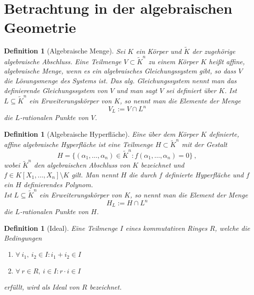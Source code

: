 \documentclass[11pt]{beamer}
\newcommand{\coloneqq}{:=}
\theoremstyle{custom}
\theoremstyle{custom}
\newtheorem{dfn}[theorem]{Definition}
\begin{document}
	\section{Betrachtung in der algebraischen Geometrie}
	\begin{frame}
		\begin{dfn}[Algebraische Menge]\label{def:alg_menge}
			\pause
			Sei $K$ ein Körper und $\tilde{K}$ der zugehörige algebraische Abschluss.
			Eine Teilmenge $V \subset \tilde{K}^n$ zu einem Körper $K$ heißt affine, algebraische Menge, wenn es ein algebraisches Gleichungssystem gibt, so dass $V$ die Lösungsmenge des Systems ist. Das alg. Gleichungssystem nennt man das definierende Gleichungssystem von $V$ und man sagt $V$ sei definiert über $K$.
			Ist $L \subseteq \tilde{K}^{n}$ ein Erweiterungskörper von $K$, so nennt man die Elemente der Menge
			\begin{equation*}
				V_{L} \coloneqq V \cap L^{n}
			\end{equation*}
			die $L$-rationalen Punkte von $V$.
		\end{dfn}
	\end{frame}
	\begin{frame}
		\begin{dfn}[Algebraische Hyperfläche]
			\pause
			Eine über dem Körper $K$ definierte, affine algebraische Hyperfläche ist eine Teilmenge $H \subset \tilde{K}^{n}$ mit der Gestalt
			\begin{equation}
				H = \{\left( \alpha_{1},\dots,\alpha_{n}\right) \in \tilde{K}^{n} \colon f\left(  \alpha_{1},\dots,\alpha_{n}\right) = 0  \} \ , 
			\end{equation}
			wobei $\tilde{K}^{n}$ den algebraischen Abschluss von $K$ bezeichnet und \newline ${f \in K\left[ X_{1},\dots, X_{n}\right] \setminus K}$ gilt. Man nennt $H$ die durch $f$ definierte Hyperfläche und $f$ ein $H$ definierendes Polynom.\\
			Ist $L \subseteq \tilde{K}^{n}$ ein Erweiterungskörper von $K$, so nennt man die Element der Menge
			\begin{equation*}
				H_{L} \coloneqq H \cap L^{n}
			\end{equation*}
			die $L$-rationalen Punkte von $H$.
		\end{dfn}
	\end{frame}
	\begin{frame}
		\begin{dfn}[Ideal]
			\pause
			Eine Teilmenge $I$ eines kommutativen Ringes $R$, welche die Bedingungen
			\begin{enumerate}
				\item $\forall \ i_1,\ i_2 \in I \colon i_1+i_2 \in I$  
				\item $\forall \ r \in R,\ i \in I \colon r \cdot i \in I$	
			\end{enumerate}
			erfüllt, wird als Ideal von $R$ bezeichnet.
		\end{dfn}
	\end{frame}
\end{document}
